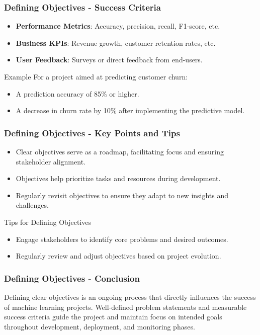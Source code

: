 \documentclass[aspectratio=169]{beamer}
\begin{document}
\begin{frame}[fragile]
    \frametitle{Defining Objectives - Success Criteria}
    \begin{itemize}
        \item \textbf{Performance Metrics}: Accuracy, precision, recall, F1-score, etc.
        \item \textbf{Business KPIs}: Revenue growth, customer retention rates, etc.
        \item \textbf{User Feedback}: Surveys or direct feedback from end-users.
    \end{itemize}
    \begin{block}{Example}
        For a project aimed at predicting customer churn:
        \begin{itemize}
            \item A prediction accuracy of 85\% or higher.
            \item A decrease in churn rate by 10\% after implementing the predictive model.
        \end{itemize}
    \end{block}
\end{frame}

\begin{frame}[fragile]
    \frametitle{Defining Objectives - Key Points and Tips}
    \begin{itemize}
        \item Clear objectives serve as a roadmap, facilitating focus and ensuring stakeholder alignment.
        \item Objectives help prioritize tasks and resources during development.
        \item Regularly revisit objectives to ensure they adapt to new insights and challenges.
    \end{itemize}
    \begin{block}{Tips for Defining Objectives}
        \begin{itemize}
            \item Engage stakeholders to identify core problems and desired outcomes.
            \item Regularly review and adjust objectives based on project evolution.
        \end{itemize}
    \end{block}
\end{frame}

\begin{frame}[fragile]
    \frametitle{Defining Objectives - Conclusion}
    Defining clear objectives is an ongoing process that directly influences the success of machine learning projects. Well-defined problem statements and measurable success criteria guide the project and maintain focus on intended goals throughout development, deployment, and monitoring phases.
\end{frame}
\end{document}
